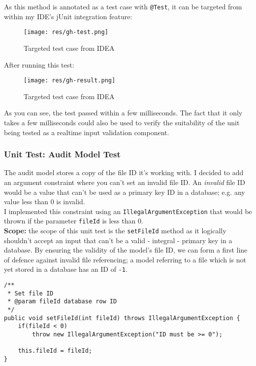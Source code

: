 \documentclass[9pt]{article}
\renewenvironment{framed}[1][\hsize]
   {\MakeFramed{\hsize#1\advance\hsize-\width \FrameRestore}}%
   {\endMakeFramed}
\begin{document}
		As this method is annotated as a test case with \texttt{@Test}, it can
		be targeted from within my IDE's jUnit integration feature:

		\begin{figure}[H]
			\centering
			\texttt{[image: res/gh-test.png]}
			\caption{Targeted test case from IDEA}
		\end{figure}

		After running this test:

		\begin{figure}[H]
			\centering
			\texttt{[image: res/gh-result.png]}
			\caption{Targeted test case from IDEA}
		\end{figure}

		As you can see, the test passed within a few milliseconds. The fact that
		it only takes a few milliseconds could also be used to verify the
		suitability of the unit being tested as a realtime input validation
		component.
			
		\subsubsection{Unit Test: Audit Model Test}
			
			The audit model stores a copy of the file ID it's working with. I
			decided to add an argument constraint where you can't set an invalid
			file ID. An \textit{invalid} file ID would be a value that can't be
			used as a primary key ID in a database; e.g. any value less than 0
			is invalid.\\

			I implemented this constraint using an
			\texttt{IllegalArgumentException} that would be thrown if the
			parameter \texttt{fileId} is less than 0.\\ 

			\textbf{Scope:} the scope of this unit test is the
			\texttt{setFileId} method as it logically shouldn't accept an input
			that can't be a valid - integral - primary key in a database. By
			ensuring the validity of the model's file ID, we can form a first
			line of defence against invalid file referencing; a model referring
			to a file which is not yet stored in a database has an ID of
			\texttt{-1}.

			\begin{framed}[1.2\textwidth]	
				\begin{verbatim}
/**
 * Set file ID
 * @param fileId database row ID
 */
public void setFileId(int fileId) throws IllegalArgumentException {
	if(fileId < 0)
		throw new IllegalArgumentException("ID must be >= 0");

	this.fileId = fileId;
}
			\end{verbatim}
		\end{framed}
\end{document}
